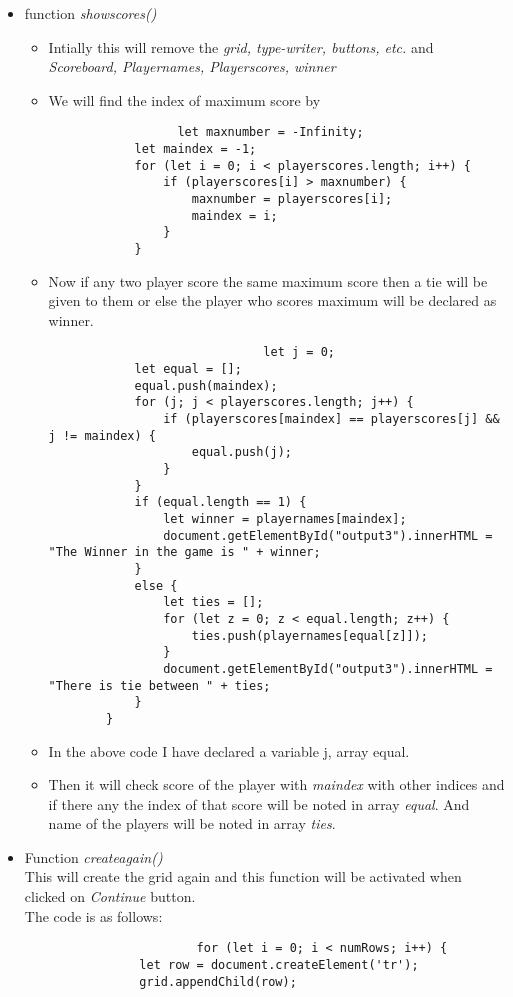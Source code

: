 \documentclass[a4paper, 11pt]{article}
\begin{document}
\begin{itemize}
        \item function \textit{showscores()}
          \begin{itemize}
              \item Intially this will remove the \textit{grid, type-writer, buttons, etc.} and \textit{Scoreboard, Playernames, Playerscores, winner}
              \item We will find the index of maximum score by 
              \begin{lstlisting}
                  let maxnumber = -Infinity;
            let maindex = -1;
            for (let i = 0; i < playerscores.length; i++) {
                if (playerscores[i] > maxnumber) {
                    maxnumber = playerscores[i];
                    maindex = i;
                }
            }
              \end{lstlisting}
              \item Now if any two player score the same maximum score then a tie will be given to them or else the player who scores maximum will be declared as winner.
              \begin{lstlisting}
                              let j = 0;
            let equal = [];
            equal.push(maindex);
            for (j; j < playerscores.length; j++) {
                if (playerscores[maindex] == playerscores[j] && j != maindex) {
                    equal.push(j);
                }
            }
            if (equal.length == 1) {
                let winner = playernames[maindex];
                document.getElementById("output3").innerHTML = "The Winner in the game is " + winner;
            }
            else {
                let ties = [];
                for (let z = 0; z < equal.length; z++) {
                    ties.push(playernames[equal[z]]);
                }
                document.getElementById("output3").innerHTML = "There is tie between " + ties;
            }
        }
              \end{lstlisting}
              \item In the above code I have declared a variable j, array equal. 
              \item Then it will check score of the player with \textit{maindex} with other indices and if there any the index of that score will be noted in array \textit{equal}. And name of the players will be noted in array \textit{ties}.
              
          \end{itemize}
        \item Function \textit{createagain()}
        \\ This will create the grid again and this function will be activated when clicked on \textit{Continue} button.\\ The code is as follows:
        \begin{lstlisting}
                        for (let i = 0; i < numRows; i++) {
                let row = document.createElement('tr');
                grid.appendChild(row);


\end{lstlisting}
\end{itemize}
\end{document}

